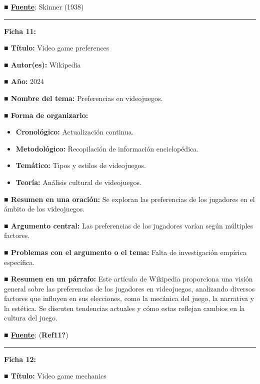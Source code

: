 \documentclass[
  letterpaper,
  DIV=11,
  numbers=noendperiod]{scrreprt}
\begin{document}
\textbf{■
\href{https://books.google.com/books/about/The_Behavior_of_Organisms.html?id=S9WNCwAAQBAJ}{Fuente}}:
Skinner (1938)

\begin{center}\rule{0.5\linewidth}{0.5pt}\end{center}

\textbf{Ficha 11:}

\textbf{■ Título:} Video game preferences

\textbf{■ Autor(es):} Wikipedia

\textbf{■ Año:} 2024

\textbf{■ Nombre del tema:} Preferencias en videojuegos.

\textbf{■ Forma de organizarlo:}

\begin{itemize}
\item
  \textbf{Cronológico:} Actualización continua.
\item
  \textbf{Metodológico:} Recopilación de información enciclopédica.
\item
  \textbf{Temático:} Tipos y estilos de videojuegos.
\item
  \textbf{Teoría:} Análisis cultural de videojuegos.
\end{itemize}

\textbf{■ Resumen en una oración:} Se exploran las preferencias de los
jugadores en el ámbito de los videojuegos.

\textbf{■ Argumento central:} Las preferencias de los jugadores varían
según múltiples factores.

\textbf{■ Problemas con el argumento o el tema:} Falta de investigación
empírica específica.

\textbf{■ Resumen en un párrafo:} Este artículo de Wikipedia proporciona
una visión general sobre las preferencias de los jugadores en
videojuegos, analizando diversos factores que influyen en sus
elecciones, como la mecánica del juego, la narrativa y la estética. Se
discuten tendencias actuales y cómo estas reflejan cambios en la cultura
del juego.

\textbf{■
\href{https://en.wikipedia.org/wiki/Video_game_preferences}{Fuente}}:
(\textbf{Ref11?})

\begin{center}\rule{0.5\linewidth}{0.5pt}\end{center}

\textbf{Ficha 12:}

\textbf{■ Título:} Video game mechanics
\end{document}
